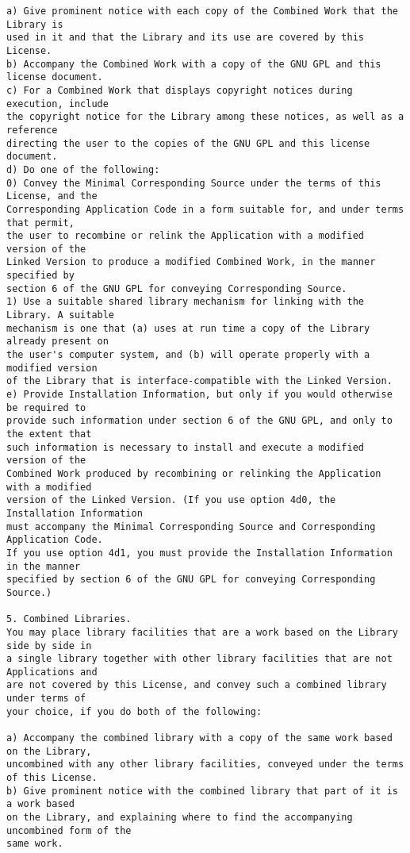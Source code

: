 \begin{verbatim}
a) Give prominent notice with each copy of the Combined Work that the Library is
used in it and that the Library and its use are covered by this License.
b) Accompany the Combined Work with a copy of the GNU GPL and this license document.
c) For a Combined Work that displays copyright notices during execution, include
the copyright notice for the Library among these notices, as well as a reference
directing the user to the copies of the GNU GPL and this license document.
d) Do one of the following:
0) Convey the Minimal Corresponding Source under the terms of this License, and the
Corresponding Application Code in a form suitable for, and under terms that permit,
the user to recombine or relink the Application with a modified version of the
Linked Version to produce a modified Combined Work, in the manner specified by
section 6 of the GNU GPL for conveying Corresponding Source.
1) Use a suitable shared library mechanism for linking with the Library. A suitable
mechanism is one that (a) uses at run time a copy of the Library already present on
the user's computer system, and (b) will operate properly with a modified version
of the Library that is interface-compatible with the Linked Version.
e) Provide Installation Information, but only if you would otherwise be required to
provide such information under section 6 of the GNU GPL, and only to the extent that
such information is necessary to install and execute a modified version of the
Combined Work produced by recombining or relinking the Application with a modified
version of the Linked Version. (If you use option 4d0, the Installation Information
must accompany the Minimal Corresponding Source and Corresponding Application Code.
If you use option 4d1, you must provide the Installation Information in the manner
specified by section 6 of the GNU GPL for conveying Corresponding Source.)

5. Combined Libraries.
You may place library facilities that are a work based on the Library side by side in
a single library together with other library facilities that are not Applications and
are not covered by this License, and convey such a combined library under terms of
your choice, if you do both of the following:

a) Accompany the combined library with a copy of the same work based on the Library,
uncombined with any other library facilities, conveyed under the terms of this License.
b) Give prominent notice with the combined library that part of it is a work based
on the Library, and explaining where to find the accompanying uncombined form of the
same work.


\end{verbatim}

